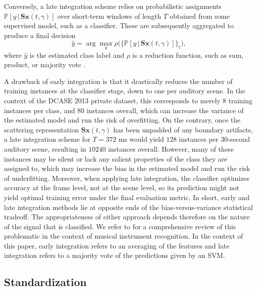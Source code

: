 \documentclass[journal]{IEEEtran}
\begin{document}
Conversely, a late integration scheme relies on probabilistic assignments $\mathbb{P}\left[y \,\vert\, \mathbf{S}\boldsymbol{x}(t,\gamma) \right]$ over short-term windows of length $T$ obtained from some supervised model, such as a classifier. These are subsequently aggregated to produce a final decision
\begin{equation}
\hat{y} = \arg \max_{y} \rho\Big(\big\{ \mathbb{P}\left[y \,\vert\, \mathbf{S}\boldsymbol{x}(t,\gamma) \right] \big\}_{t} \Big)\mbox{,}
\end{equation}
where $\hat{y}$ is the estimated class label and $\rho$ is a reduction function, such as sum, product, or majority vote \cite{Kittler1998}.

A drawback of early integration is that it drastically reduces the number of training instances at the classifier stage, down to one per auditory scene.
In the context of the DCASE 2013 private dataset, this corresponds to merely $8$ training instances per class, and $80$ instances overall, which can increase the variance of the estimated model and run the risk of overfitting.
On the contrary, once the scattering representation $\mathbf{S}\boldsymbol{x}(t,\gamma)$ has been unpadded of any boundary artifacts, a late integration scheme for $T=372\textrm{ ms}$ would yield $128$ instances per $30$-second auditory scene, resulting in $10240$ instances overall.
However, many of these instances may be silent or lack any salient properties of the class they are assigned to, which may increase the bias in the estimated model and run the risk of underfitting.
Moreover, when applying late integration, the classifier optimizes accuracy at the frame level, not at the scene level, so its prediction might not yield optimal training error under the final evaluation metric.
In short, early and late integration methods lie at opposite ends of the bias-versus-variance statistical tradeoff. The appropriateness of either approach depends therefore on the nature of the signal that is classified.
We refer to \cite{Joder2009} for a comprehensive review of this problematic in the context of musical instrument recognition.
In the context of this paper, early integration refers to an averaging of the features and late integration refers to a majority vote of the predictions given by an SVM. 

\subsection{Standardization}
\label{sec:stand}
\end{document}
